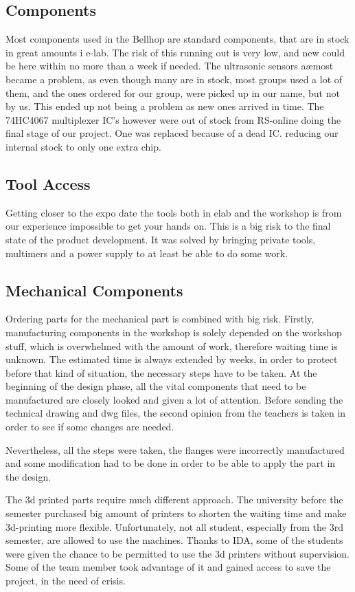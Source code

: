 \documentclass[11pt]{article}
\begin{document}
\subsection*{Components}
    Most components used in the Bellhop are standard components, that are in stock in great amounts i e-lab. The risk of this running out is very low, and new could be here within no more than a week if needed. The ultrasonic sensors aæmost became a problem, as even though many are in stock, most groups used a lot of them, and the ones ordered for our group, were picked up in our name, but not by us. This ended up not being a problem as new ones arrived in time. The 74HC4067 multiplexer IC’s however were out of stock from RS-online doing the final stage of our project. One was replaced because of a dead IC. reducing our internal stock to only one extra chip. 

\subsection*{Tool Access}
Getting closer to the expo date the tools both in elab and the workshop is from our experience impossible to get your hands on. This is a big risk to the final state of the product development. It was solved by bringing private tools, multimers and a power supply to at least be able to do some work. 

\subsection*{Mechanical Components}
Ordering parts for the mechanical part is combined with big risk. Firstly, manufacturing components in the workshop is solely depended on the workshop stuff, which is overwhelmed with the amount of work, therefore waiting time is unknown. The estimated time is always extended by weeks, in order to protect before that kind of situation, the necessary steps have to be taken. At the beginning of the design phase, all the vital components that need to be manufactured are closely looked and given a lot of attention. Before sending the technical drawing and dwg files, the second opinion from the teachers is taken in order to see if some changes are needed.


Nevertheless, all the steps were taken, the flanges were incorrectly manufactured and some modification had to be done in order to be able to apply the part in the design.


The 3d printed parts require much different approach. The university before the semester purchased big amount of printers to shorten the waiting time and make 3d-printing more flexible. Unfortunately, not all student, especially from the 3rd semester, are allowed to use the machines. Thanks to IDA, some of the students were given the chance to be permitted to use the 3d printers without supervision. Some of the team member took advantage of it and gained access to save the project, in the need of crisis.
\end{document}
